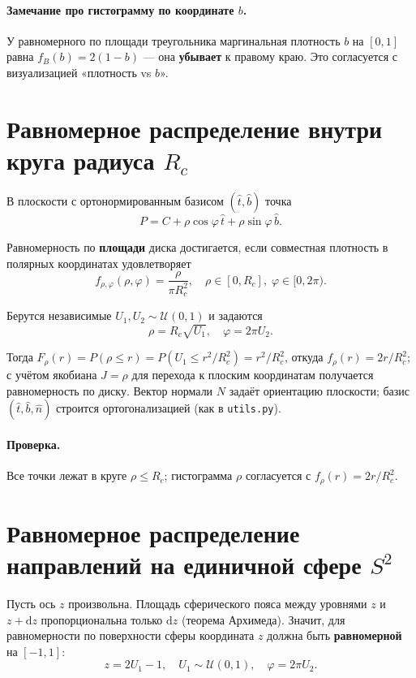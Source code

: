 \documentclass[12pt,a4paper]{article}
\begin{document}
\paragraph{Замечание про гистограмму по координате $b$.}
У равномерного по площади треугольника маргинальная плотность $b$ на $[0,1]$ равна $f_B(b) = 2(1-b)$ --- она \textbf{убывает} к правому краю. Это согласуется с визуализацией «плотность vs $b$».

\section{Равномерное распределение внутри круга радиуса $R_c$}

В плоскости с ортонормированным базисом $(\hat t, \hat b)$ точка
\[
P = C + \rho\cos\varphi\,\hat t + \rho\sin\varphi\,\hat b.
\]

Равномерность по \textbf{площади} диска достигается, если совместная плотность в полярных координатах удовлетворяет
\[
f_{\rho,\varphi}(\rho,\varphi) = \frac{\rho}{\pi R_c^2}, \quad \rho \in [0,R_c],\; \varphi \in [0,2\pi).
\]

Берутся независимые $U_1, U_2 \sim \mathcal{U}(0,1)$ и задаются
\[
\rho = R_c\sqrt{U_1}, \quad \varphi = 2\pi U_2.
\]

Тогда $F_\rho(r) = P(\rho \le r) = P(U_1 \le r^2/R_c^2) = r^2/R_c^2$, откуда $f_\rho(r) = 2r/R_c^2$; с учётом якобиана $J = \rho$ для перехода к плоским координатам получается равномерность по диску. Вектор нормали $N$ задаёт ориентацию плоскости; базис $(\hat t,\hat b,\hat n)$ строится ортогонализацией (как в \texttt{utils.py}).

\paragraph{Проверка.}
Все точки лежат в круге $\rho \le R_c$; гистограмма $\rho$ согласуется с $f_\rho(r) = 2r/R_c^2$.

\section{Равномерное распределение направлений на единичной сфере $S^2$}

Пусть ось $z$ произвольна. Площадь сферического пояса между уровнями $z$ и $z+\mathrm{d}z$ пропорциональна только $\mathrm{d}z$ (теорема Архимеда). Значит, для равномерности по поверхности сферы координата $z$ должна быть \textbf{равномерной} на $[-1,1]$:
\[
z = 2U_1 - 1, \quad U_1 \sim \mathcal{U}(0,1), \quad \varphi = 2\pi U_2.
\]
\end{document}
